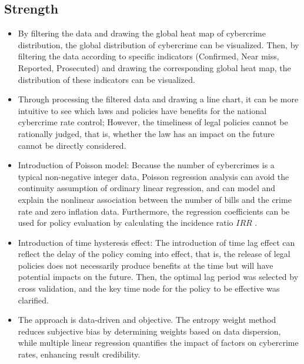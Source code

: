 
\subsection{Strength}\label{subsec:strength} %
    \begin{itemize}
        \item By filtering the data and drawing the global heat map of cybercrime distribution,
            the global distribution of cybercrime can be visualized.
            Then, by filtering the data according to specific indicators
            (Confirmed, Near miss, Reported, Prosecuted)
            and drawing the corresponding global heat map,
            the distribution of these indicators can be visualized.
        \item Through processing the filtered data and drawing a line chart,
            it can be more intuitive to see which laws and policies have benefits for the national cybercrime rate control;
            However, the timeliness of legal policies cannot be rationally judged, that is,
            whether the law has an impact on the future cannot be directly considered.
        \item Introduction of Poisson model: Because the number of cybercrimes is a typical non-negative integer data,
            Poisson regression analysis can avoid the continuity assumption of ordinary linear regression,
            and can model and explain the nonlinear association between the number of bills and the crime rate and zero inflation data.
            Furthermore, the regression coefficients can be used for policy evaluation by calculating the incidence ratio $IRR$ .
        \item Introduction of time hysteresis effect:
            The introduction of time lag effect can reflect the delay of the policy coming into effect, that is,
            the release of legal policies does not necessarily produce benefits at the time but will have potential impacts on the future.
            Then, the optimal lag period was selected by cross validation,
            and the key time node for the policy to be effective was clarified.
        \item The approach is data-driven and objective.
            The entropy weight method reduces subjective bias by determining weights based on data dispersion,
            while multiple linear regression quantifies the impact of factors on cybercrime rates, enhancing result credibility.

\end{itemize}
